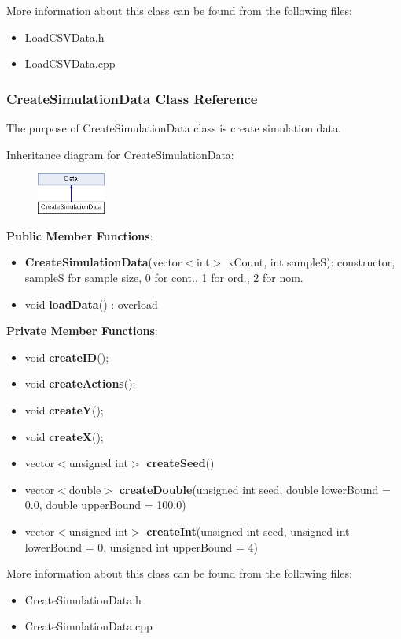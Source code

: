 \documentclass{article}
\begin{document}
More information about this class can be found from the following files:
\begin{itemize}
\item LoadCSVData.h
\item LoadCSVData.cpp
\end{itemize}


\subsubsection{CreateSimulationData  Class Reference}
The purpose of CreateSimulationData class is create simulation data.

Inheritance diagram for CreateSimulationData:
\begin{figure}[H]
\centering
\includegraphics[width=0.2\textwidth]{class_create_simulation_data.png}
\end{figure}

\textbf{Public Member Functions}:
\begin{itemize}
\item \textbf{CreateSimulationData}(vector$<$int$>$ xCount, int sampleS): constructor, sampleS for sample size, 0 for cont., 1 for ord., 2 for nom. 
\item void \textbf{loadData}() : overload
\end{itemize}

\textbf{Private Member Functions}:
\begin{itemize}
\item void \textbf{createID}();
\item void \textbf{createActions}();
\item void \textbf{createY}();
\item void \textbf{createX}();
\item vector$<$unsigned int$>$ \textbf{createSeed}()
\item vector$<$double$>$ \textbf{createDouble}(unsigned int seed, double lowerBound = 0.0, double upperBound = 100.0)
\item vector$<$unsigned int$>$ \textbf{createInt}(unsigned int seed, unsigned int lowerBound = 0, unsigned int upperBound = 4)
\end{itemize}




More information about this class can be found from the following files:
\begin{itemize}
\item CreateSimulationData.h
\item CreateSimulationData.cpp
\end{itemize}
\end{document}
